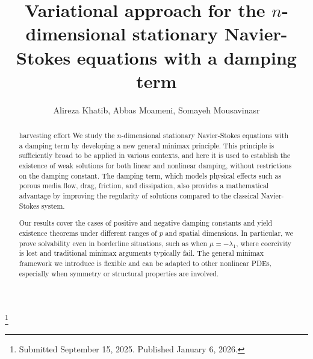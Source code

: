 \documentclass[reqno]{amsart}
\begin{document}
\title[\hfilneg EJDE-2026/01\hfil $n$-dimensional stationary Navier-Stokes equations]
{Variational approach for the $n$-dimensional stationary Navier-Stokes equations
with a damping term}

\author[A. Khatib, A. Moameni, S. Mousavinasr \hfil EJDE-2026/01\hfilneg]
{Alireza Khatib, Abbas Moameni, Somayeh Mousavinasr}

\address{Alireza Khatib \newline
Universidade Federal do Amazonas, Manaus, AM, Brazil}

\address{Abbas Moameni \newline
School of Mathematics and Statistics,
Carleton University, Ottawa, ON,  Canada}

\address{Somayeh Mousavinasr \newline
Universidade Federal do Amazonas,
Manaus,  AM, Brazil}

\thanks{Submitted September 15, 2025. Published January 6, 2026.}

\begin{abstract}harvesting effort
We study the $n$-dimensional stationary Navier-Stokes equations with a damping
term by developing a new general minimax principle. This principle is sufficiently
broad to be applied in various contexts, and here it is used to establish the existence
of weak solutions for both linear and nonlinear damping, without restrictions on the
damping constant. The damping term, which models physical effects such as porous media
flow, drag, friction, and dissipation, also provides a mathematical advantage by
improving the regularity of solutions compared to the classical Navier-Stokes system.

Our results cover the cases of positive and negative damping constants and
yield existence theorems under different ranges of $p$ and spatial dimensions.
In particular, we prove solvability even in borderline situations,
such as when $\mu = -\lambda_1$, where coercivity is lost and traditional minimax
arguments typically fail. The general minimax framework we introduce is flexible and
can be adapted to other nonlinear PDEs, especially when symmetry or structural properties
are involved.
\end{abstract}

\maketitle
{}
\newtheorem{theorem}{Theorem}[section]
\newtheorem{lemma}[theorem]{Lemma}
\newtheorem{corollary}[theorem]{Corollary}
\newtheorem{remark}[theorem]{Remark}
\allowdisplaybreaks
\end{document}
